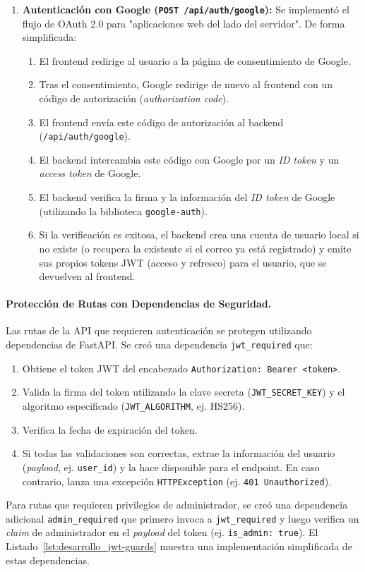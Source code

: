 \begin{enumerate}[label=\alph*),leftmargin=*]
  \item \textbf{Autenticación con Google (\texttt{POST /api/auth/google}):} Se implementó el flujo de OAuth 2.0 para "aplicaciones web del lado del servidor". De forma simplificada:
        \begin{enumerate}
            \item El frontend redirige al usuario a la página de consentimiento de Google.
            \item Tras el consentimiento, Google redirige de nuevo al frontend con un código de autorización (\emph{authorization code}).
            \item El frontend envía este código de autorización al backend (\texttt{/api/auth/google}).
            \item El backend intercambia este código con Google por un \emph{ID token} y un \emph{access token} de Google.
            \item El backend verifica la firma y la información del \emph{ID token} de Google (utilizando la biblioteca \texttt{google-auth}).
            \item Si la verificación es exitosa, el backend crea una cuenta de usuario local si no existe (o recupera la existente si el correo ya está registrado) y emite sus propios tokens JWT (acceso y refresco) para el usuario, que se devuelven al frontend.
        \end{enumerate}
\end{enumerate}

\paragraph{Protección de Rutas con Dependencias de Seguridad.}
Las rutas de la API que requieren autenticación se protegen utilizando dependencias de FastAPI. Se creó una dependencia \texttt{jwt\_required} que:
\begin{enumerate}
    \item Obtiene el token JWT del encabezado \texttt{Authorization: Bearer <token>}.
    \item Valida la firma del token utilizando la clave secreta (\texttt{JWT\_SECRET\_KEY}) y el algoritmo especificado (\texttt{JWT\_ALGORITHM}, ej. HS256).
    \item Verifica la fecha de expiración del token.
    \item Si todas las validaciones son correctas, extrae la información del usuario (\emph{payload}, ej. \texttt{user\_id}) y la hace disponible para el endpoint. En caso contrario, lanza una excepción \texttt{HTTPException} (ej. \texttt{401 Unauthorized}).
\end{enumerate}
Para rutas que requieren privilegios de administrador, se creó una dependencia adicional \texttt{admin\_required} que primero invoca a \texttt{jwt\_required} y luego verifica un \emph{claim} de administrador en el \emph{payload} del token (ej. \texttt{is\_admin: true}). El Listado~\ref{lst:desarrollo_jwt-guards} muestra una implementación simplificada de estas dependencias.

